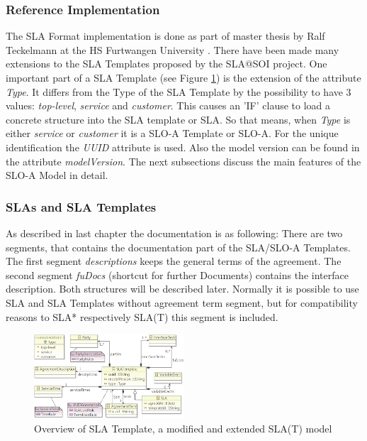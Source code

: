 \subsubsection{Reference Implementation}\label{section_ref_impl}
The SLA Format implementation is done as part of master thesis by Ralf Teckelmann at the HS Furtwangen University \cite{Teckelmann2012}. There have been made many extensions to the SLA Templates proposed by the SLA@SOI project.
One important part of a SLA Template (see Figure \ref{fig:overview_SLAT}) is the extension of the attribute {\it Type}. It differs from the Type of the SLA Template by the possibility to have 3 values: {\it top-level}, {\it service} and {\it customer}. This causes an 'IF' clause to load a concrete structure into the SLA template or SLA. So that means, when {\it Type} is either {\it service} or {\it customer} it is a SLO-A Template or SLO-A. For the unique identification the {\it UUID} attribute is used. Also the model version can be found in the attribute {\it modelVersion}.
The next subsections discuss the main features of the SLO-A Model in detail.

\subsubsection{SLAs and SLA Templates}
As described in last chapter the documentation is as following: There are two segments, that contains the documentation part of the SLA/SLO-A Templates. The first segment {\it descriptions} keeps the general terms of the agreement. The second segment {\it fuDocs} (shortcut for further Documents) contains the interface description. Both structures will be described later. Normally it is possible to use SLA and SLA Templates without agreement term segment, but for compatibility reasons to SLA* respectively SLA(T) this segment is included.
\begin{figure}[ht]
\includegraphics[width=0.5\textwidth]{fig/sloa_slas_sla-templates.png}
\caption{Overview of SLA Template, a modified and extended SLA(T) model \cite{Lambea2011}}
\label{fig:overview_SLAT}
\end{figure}

